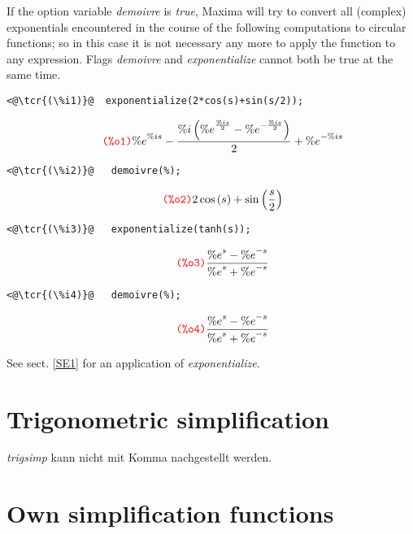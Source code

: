 \documentclass[../Maxima_Workbook.tex]{subfiles}
\begin{document}
\lz If the option variable \emph{demoivre} is \emph{true}, Maxima will try to convert all (complex) exponentials encountered in the course of the following computations to circular functions; so in this case it is not necessary any more to apply the function to any expression. Flags \emph{demoivre} and \emph{exponentialize} cannot both be true at the same time.

\lz \begin{small}
\color{blue} \leqn
\begin{lstlisting}
<@\tcr{(\%i1)}@  exponentialize(2*cos(s)+sin(s/2));
\end{lstlisting}
\vspace{-5mm} \[\tag*{\tcr{\ttfamily (\%o1)}} {{\% e}^{\% i s}}-\frac{\% i \left( {{\% e}^{\frac{\% i s}{2}}}-{{\% e}^{-\frac{\% i s}{2}}}\right) }{2}+{{\% e}^{-\% i s}} \]
\vspace{-6mm} \begin{lstlisting}
<@\tcr{(\%i2)}@   demoivre(%);
\end{lstlisting}
\vspace{-5mm} \[\tag*{\tcr{\ttfamily (\%o2)}} 2 \cos{(s)}+\sin{\left( \frac{s}{2}\right) } \]
\vspace{-6mm} \begin{lstlisting}
<@\tcr{(\%i3)}@   exponentialize(tanh(s));
\end{lstlisting}
\vspace{-5mm} \[\tag*{\tcr{\ttfamily (\%o3)}} \frac{{{\% e}^{s}}-{{\% e}^{-s}}}{{{\% e}^{s}}+{{\% e}^{-s}}} \]
\vspace{-6mm} \begin{lstlisting}
<@\tcr{(\%i4)}@   demoivre(%);
\end{lstlisting}
\vspace{-5mm} \[\tag*{\tcr{\ttfamily (\%o4)}} \frac{{{\% e}^{s}}-{{\% e}^{-s}}}{{{\% e}^{s}}+{{\% e}^{-s}}} \]
\color{black} \reqn
\end{small} \vspace{-4mm}

\lz See sect. \ref{SE1} for an application of \emph{exponentialize}.

\section{Trigonometric simplification}

\emph{trigsimp} kann nicht mit Komma nachgestellt werden.

\section{Own simplification functions}
\end{document}
